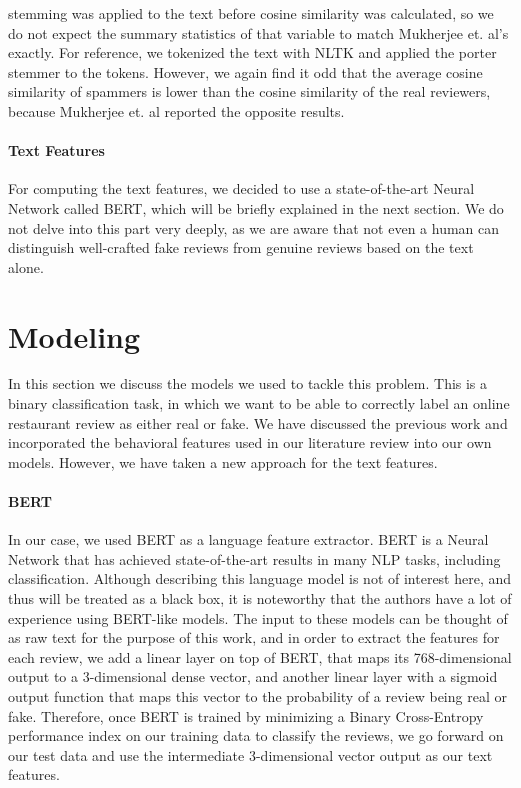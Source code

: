 \documentclass[man, floatsintext, 10pt]{apa6}
\begin{document}
stemming was applied to the text before cosine similarity was calculated, so we do not expect the summary statistics of that variable to match Mukherjee et. al's exactly. For reference, we tokenized the text with NLTK and applied the porter stemmer to the tokens. However, we again find it odd that the average cosine similarity of spammers is lower than the cosine similarity of the real reviewers, because Mukherjee et. al reported the opposite results.
\vspace{2mm}
\paragraph{Text Features} For computing the text features, we decided to use a state-of-the-art Neural Network called BERT, which will be briefly explained in the next section. We do not delve into this part very deeply, as we are aware that not even a human can distinguish well-crafted fake reviews from genuine reviews based on the text alone.


\section{Modeling}

In this section we discuss the models we used to tackle this problem. This is a binary classification task, in which we want to be able to correctly label an online restaurant review as either real or fake. We have discussed the previous work and incorporated the behavioral features used in our literature review into our own models. However, we have taken a new approach for the text features.

\vspace{2mm}

\paragraph{BERT} In our case, we used BERT as a language feature extractor. BERT is a Neural Network that has achieved state-of-the-art results in many NLP tasks, including classification. Although describing this language model is not of interest here, and thus will be treated as a black box, it is noteworthy that the authors have a lot of experience using BERT-like models. The input to these models can be thought of as raw text for the purpose of this work, and in order to extract the features for each review, we add a linear layer on top of BERT, that maps its 768-dimensional output to a 3-dimensional dense vector, and another linear layer with a sigmoid output function that maps this vector to the probability of a review being real or fake. Therefore, once BERT is trained by minimizing a Binary Cross-Entropy performance index on our training data to classify the reviews, we go forward on our test data and use the intermediate 3-dimensional vector output as our text features. 
\end{document}
